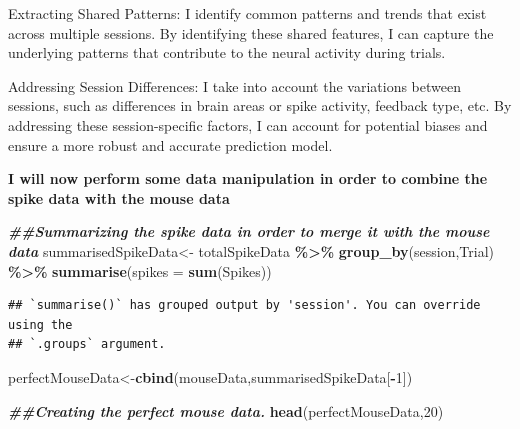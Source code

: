 \documentclass[
]{article}
\newenvironment{Shaded}{\begin{snugshade}}{\end{snugshade}}
\newcommand{\AttributeTok}[1]{\textcolor[rgb]{0.13,0.29,0.53}{#1}}
\newcommand{\DecValTok}[1]{\textcolor[rgb]{0.00,0.00,0.81}{#1}}
\newcommand{\DocumentationTok}[1]{\textcolor[rgb]{0.56,0.35,0.01}{\textbf{\textit{#1}}}}
\newcommand{\FunctionTok}[1]{\textcolor[rgb]{0.13,0.29,0.53}{\textbf{#1}}}
\newcommand{\NormalTok}[1]{#1}
\newcommand{\OtherTok}[1]{\textcolor[rgb]{0.56,0.35,0.01}{#1}}
\newcommand{\SpecialCharTok}[1]{\textcolor[rgb]{0.81,0.36,0.00}{\textbf{#1}}}
\begin{document}
Extracting Shared Patterns: I identify common patterns and trends that
exist across multiple sessions. By identifying these shared features, I
can capture the underlying patterns that contribute to the neural
activity during trials.

Addressing Session Differences: I take into account the variations
between sessions, such as differences in brain areas or spike activity,
feedback type, etc. By addressing these session-specific factors, I can
account for potential biases and ensure a more robust and accurate
prediction model.

\textbf{I will now perform some data manipulation in order to combine
the spike data with the mouse data}

\begin{Shaded}
\begin{Highlighting}[]
\DocumentationTok{\#\#Summarizing the spike data in order to merge it with the mouse data}
\NormalTok{summarisedSpikeData}\OtherTok{\textless{}{-}}\NormalTok{ totalSpikeData }\SpecialCharTok{\%\textgreater{}\%}  \FunctionTok{group\_by}\NormalTok{(session,Trial) }\SpecialCharTok{\%\textgreater{}\%} \FunctionTok{summarise}\NormalTok{(}\AttributeTok{spikes =} \FunctionTok{sum}\NormalTok{(Spikes))}
\end{Highlighting}
\end{Shaded}

\begin{verbatim}
## `summarise()` has grouped output by 'session'. You can override using the
## `.groups` argument.
\end{verbatim}

\begin{Shaded}
\begin{Highlighting}[]
\NormalTok{perfectMouseData}\OtherTok{\textless{}{-}}\FunctionTok{cbind}\NormalTok{(mouseData,summarisedSpikeData[}\SpecialCharTok{{-}}\DecValTok{1}\NormalTok{])}



\DocumentationTok{\#\#Creating the perfect mouse data.}
\FunctionTok{head}\NormalTok{(perfectMouseData,}\DecValTok{20}\NormalTok{)}
\end{Highlighting}
\end{Shaded}
\end{document}
